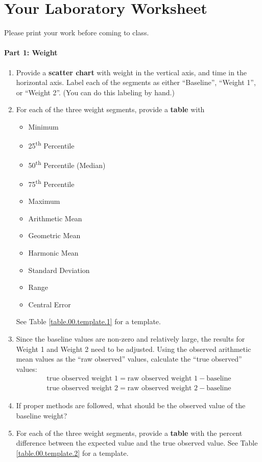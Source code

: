 \section{Your Laboratory Worksheet}
%
Please print your work before coming to class.
%
\paragraph{Part 1: Weight}
%
\begin{enumerate}
    \item Provide a \textbf{scatter chart} with weight in the vertical axis, and time in the horizontal axis. Label each of the segments as either ``Baseline'', ``Weight 1'', or ``Weight 2''. (You can do this labeling by hand.)
    \item For each of the three weight segments, provide a \textbf{table} with
    \begin{itemize}
        \item Minimum
        \item 25\textsuperscript{th} Percentile
        \item 50\textsuperscript{th} Percentile (Median)
        \item 75\textsuperscript{th} Percentile
        \item Maximum
        \item Arithmetic Mean
        \item Geometric Mean
        \item Harmonic Mean
        \item Standard Deviation
        \item Range
        \item Central Error
    \end{itemize}
    See Table \ref{table.00.template.1} for a template.
    \item Since the baseline values are non-zero and relatively large, the results for Weight 1 and Weight 2 need to be adjusted. Using the observed arithmetic mean values as the ``raw observed'' values, calculate the ``true observed'' values:
    \begin{gather}
        \text{true observed weight 1} = \text{raw observed weight 1} - \text{baseline} \\
        \text{true observed weight 2} = \text{raw observed weight 2} - \text{baseline}
    \end{gather}
    \item If proper methods are followed, what should be the observed value of the baseline weight?
    \item For each of the three weight segments, provide a \textbf{table} with the percent difference between the expected value and the true observed value. See Table \ref{table.00.template.2} for a template.
\end{enumerate}
%
